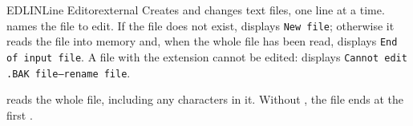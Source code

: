 \begin{DosEntry}{EDLIN}{Line Editor}{external}
\Purpose Creates and changes text files, one line at a time.
\Format {}
\Remarks
{} names the file to edit.  If the file does not exist,
 displays \texttt{New file}; otherwise it reads the file into
memory and, when the whole file has been read, displays \texttt{End of
input file}.  A file with the extension  cannot be edited:
 displays \texttt{Cannot edit .BAK file--rename file}.

 reads the whole file, including any  characters in
it.  Without , the file ends at the first .


\end{DosEntry}
